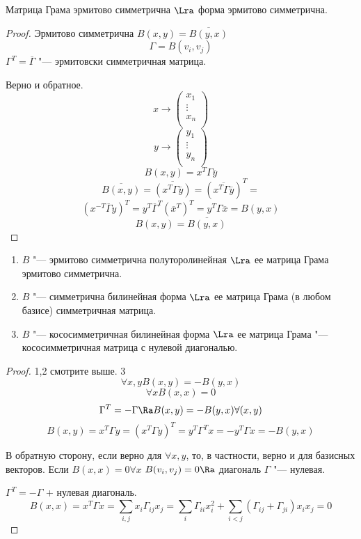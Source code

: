 \begin{lemma}{}
Матрица Грама эрмитово симметрична $\Lra$ форма эрмитово симметрична.
\end{lemma}
\begin{proof}
Эрмитово симметрична $B(x, y) = \overline{B(y, x)}$
$$\Gamma = B(v_i, v_j)$$
$\Gamma^T = \overline{\Gamma}$ "--- эрмитовски симметричная матрица.

Верно и обратное.
$$x \to \begin{pmatrix}
x_1\\
\vdots\\
x_n\\
\end{pmatrix}$$
$$y \to \begin{pmatrix}
y_1\\
\vdots\\
y_n\\
\end{pmatrix}$$
$$B(x, y) = x^{T}\Gamma \overline{y}$$
$$\overline{B(x, y)} = \overline{(x^T \Gamma \overline{y})} = (\overline{x^T \Gamma \overline{y}})^T =$$
$$(x^{-T}\overline{\Gamma}y)^T = y^{T}\overline{\Gamma}^{T}(\overline{x}^T)^T = y^T \Gamma \overline{x} = B(y, x)$$
$$B(x, y) = \overline{B(y, x)}$$

\end{proof}
\begin{lemma}{}
\begin{enumerate}
\item $B$ "--- эрмитово симметрична полуторолинейная $\Lra$ ее матрица Грама эрмитово симметрична.
\item $B$ "--- симметрична билинейная  форма $\Lra$ ее матрица Грама (в любом базисе) симметричная матрица.
\item $B$ "--- кососимметричная билинейная форма $\Lra$ ее матрица Грама "--- 
кососимметричная матрица с нулевой диагональю.
\end{enumerate}

\end{lemma}
\begin{proof}
1,2 смотрите выше.
3 $$\forall x,y B(x, y) = -B(y,x)$$
$$\forall x B(x, x) = 0$$
$$\Gamma^T = -\Gamma \Ra B(x, y) = -B(y, x) \forall (x, y)$$
$$B(x, y) = x^{T}\Gamma y = (x^T \Gamma y)^T = y^T\Gamma^T x = -y^T\Gamma x = -B(y, x)$$

В обратную сторону, если верно для $\forall x,y$, то, в частности, верно и 
для базисных векторов.
Если $B(x, x) = 0 \forall x$
$B(v_i, v_j) = 0 \Ra$ диагональ $\Gamma$ "--- нулевая.

$\Gamma^{T} = -\Gamma $ + нулевая диагональ.
$$B(x, x) = x^{T}\Gamma x = \sum_{i, j}x_i\Gamma_{ij}x_j = 
\sum_{i}\Gamma_{ii}x_i^2 + \sum_{i < j}(\Gamma_{ij}+ \Gamma_{ji})x_ix_j = 0$$
\end{proof}

